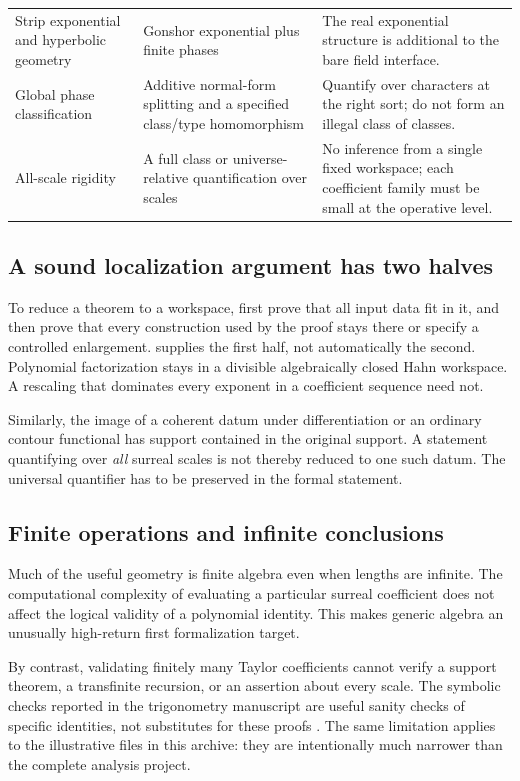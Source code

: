 \documentclass[11pt,letterpaper]{article}
\numberwithin{equation}{section}
\theoremstyle{definition}
\theoremstyle{remark}
\begin{document}
\begin{longtable}{@{}L{0.25\textwidth}L{0.32\textwidth}L{0.34\textwidth}@{}}
Strip exponential and hyperbolic geometry & Gonshor exponential plus finite phases & The real exponential structure is additional to the bare field interface.\\[0.4em]
Global phase classification & Additive normal-form splitting and a specified class/type homomorphism & Quantify over characters at the right sort; do not form an illegal class of classes.\\[0.4em]
All-scale rigidity & A full class or universe-relative quantification over scales & No inference from a single fixed workspace; each coefficient family must be small at the operative level.\\[0.4em]
\end{longtable}

\subsection{A sound localization argument has two halves}
To reduce a theorem to a workspace, first prove that all input data fit in it, and then prove that every construction used by the proof stays there or specify a controlled enlargement.  supplies the first half, not automatically the second. Polynomial factorization stays in a divisible algebraically closed Hahn workspace. A rescaling that dominates every exponent in a coefficient sequence need not.

Similarly, the image of a coherent datum under differentiation or an ordinary contour functional has support contained in the original support. A statement quantifying over \emph{all} surreal scales is not thereby reduced to one such datum. The universal quantifier has to be preserved in the formal statement.

\subsection{Finite operations and infinite conclusions}
Much of the useful geometry is finite algebra even when lengths are infinite. The computational complexity of evaluating a particular surreal coefficient does not affect the logical validity of a polynomial identity. This makes generic algebra an unusually high-return first formalization target.

By contrast, validating finitely many Taylor coefficients cannot verify a support theorem, a transfinite recursion, or an assertion about every scale. The symbolic checks reported in the trigonometry manuscript are useful sanity checks of specific identities, not substitutes for these proofs \cite[\S17.3]{TrigSource}. The same limitation applies to the illustrative files in this archive: they are intentionally much narrower than the complete analysis project.
\end{document}
